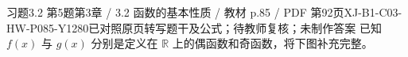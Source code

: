 \par\noindent\begin{minipage}{\linewidth}
\begin{bankitem}{习题3.2 第5题}{第3章 / 3.2 函数的基本性质 / 教材 p.85 / PDF 第92页}{XJ-B1-C03-HW-P085-Y1280}{已对照原页转写题干及公式；待教师复核；未制作答案}
已知 $f(x)$ 与 $g(x)$ 分别是定义在 $\mathbb R$ 上的偶函数和奇函数，将下图补充完整。
\end{bankitem}
\end{minipage}\par\medskip
